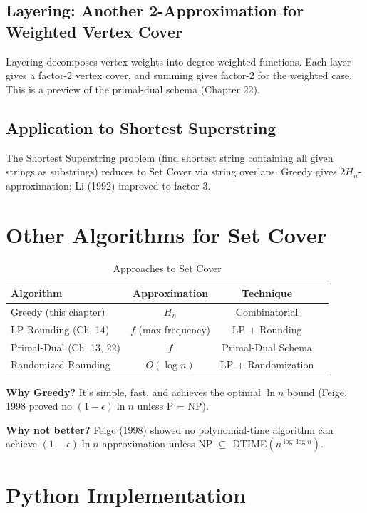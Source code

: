 \documentclass[11pt,oneside]{book}
\begin{document}
\subsection{Layering: Another 2-Approximation for Weighted Vertex Cover}

Layering decomposes vertex weights into degree-weighted functions. Each layer gives a factor-2 vertex cover, and summing gives factor-2 for the weighted case. This is a preview of the primal-dual schema (Chapter 22).

\subsection{Application to Shortest Superstring}

The Shortest Superstring problem (find shortest string containing all given strings as substrings) reduces to Set Cover via string overlaps. Greedy gives $2H_n$-approximation; Li (1992) improved to factor 3.

\section{Other Algorithms for Set Cover}

\begin{table}[H]
\centering
\caption{Approaches to Set Cover}
\begin{tabular}{lccc}
\toprule
Algorithm & Approximation & Technique \\
\midrule
Greedy (this chapter) & $H_n$ & Combinatorial \\
LP Rounding (Ch. 14) & $f$ (max frequency) & LP + Rounding \\
Primal-Dual (Ch. 13, 22) & $f$ & Primal-Dual Schema \\
Randomized Rounding & $O(\log n)$ & LP + Randomization \\
\bottomrule
\end{tabular}
\end{table}

\textbf{Why Greedy?} It's simple, fast, and achieves the optimal $\ln n$ bound (Feige, 1998 proved no $(1-\epsilon)\ln n$ unless P = NP).

\textbf{Why not better?} Feige (1998) showed no polynomial-time algorithm can achieve $(1-\epsilon)\ln n$ approximation unless NP $\subseteq$ DTIME$(n^{\log\log n})$.

\section{Python Implementation}
\end{document}
